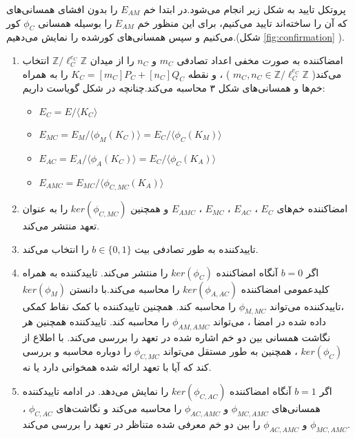 \documentclass[12pt,a4paper]{article}
\theoremstyle{plain}
\theoremstyle{definition}
\theoremstyle{remark}
\begin{document}
پروتکل تایید به شکل زیر انجام می‌شود.در ابتدا خم 
$E_{AM}$
را بدون افشای همسانی‌های که آن را ساخته‌اند تایید می‌کنیم، برای این منظور خم
$E_{AM}$
را بوسیله همسانی 
$\phi_C$
کور می‌کنیم و سپس همسانی‌های کورشده را نمایش می‌دهیم‌.(شکل 
\ref{fig:confirmation}
).

\begin{enumerate}
	\item 
	امضاکننده به صورت مخفی اعداد تصادفی
	$m_C$
	و
	$n_C$
	را از میدان 
	$\mathbb{Z} / \ell_C^{e_C} \mathbb{Z}$
	انتخاب می‌کند(
	$m_C , n_C \in \mathbb{Z} / \ell_C^{e_C} \mathbb{Z}$
	)
	، و نقطه
	$K_C = [m_C]P_C + [n_C]Q_C$
	را به همراه خم‌ها و همسانی‌های شکل ۳ محاسبه می‌کند.چنانچه در شکل گویاست داریم:
	\begin{itemize}
		\item 
		$E_C = E / \langle K_C \rangle$
		
		\item 
		$E_{MC} = E_M / \langle \phi_M(K_C) \rangle = E_C / \langle \phi_C(K_M) \rangle$
		
		\item 
		$E_{AC} = E_A / \langle \phi_A(K_C) \rangle = E_C / \langle \phi_C(K_A) \rangle$
		
		\item 
		$E_{AMC} = E_{MC} / \langle \phi_{C,MC}(K_A) \rangle $
	\end{itemize}

	\item 
	امضاکننده خم‌های
	$E_C$
	،
	$E_{AC}$
	،
	$E_{MC}$
	،
	$E_{AMC}$
	و همچنین 
	$ker(\phi_{C,MC})$
	را به عنوان تعهد منتشر می‌کند.
	
	\item 
	تاییدکننده به طور تصادفی بیت 
	$b \in \{0,1\}$
	را انتخاب می‌کند.
	
	\item 
	اگر 
	 $b=0$
	 آنگاه امضاکننده 
	 $ker(\phi_C)$
	 را منتشر می‌کند. تاییدکننده به همراه کلیدعمومی امضاکننده 
	 $ker(\phi_{A,AC})$
	 را محاسبه می‌کند.با دانستن
	 $ker(\phi_M)$
	 ،تاییدکننده می‌تواند 
	 $\phi_{M,MC}$
	 را محاسبه کند. همچنین تاییدکننده با کمک نقاط کمکی داده شده در امضا ، می‌تواند
	 $\phi_{AM,AMC}$
	 را محاسبه کند. تاییدکننده همچنین هر نگاشت همسانی‌ بین دو خم اشاره شده در تعهد را بررسی می‌کند.
با اطلاع از 
$ker(\phi_C)$
، همچنین به طور مستقل می‌تواند 
$\phi_{C,MC}$
را دوباره محاسبه و بررسی کند که آیا با تعهد ارائه شده همخوانی دارد یا نه.

\item 
اگر
$b=1$
آنگاه امضاکننده 
$ker(\phi_{C,AC})$
را نمایش می‌دهد. در ادامه تاییدکننده همسانی‌های 
$\phi_{MC,AMC}$
و
$\phi_{AC,AMC}$
را محاسبه می‌کند و نگاشت‌های 
$\phi_{C,AC}$
،
$\phi_{MC,AMC}$
و
$\phi_{AC,AMC}$
را بین دو خم معرفی شده متناظر در تعهد را بررسی می‌کند.
\end{enumerate}
\end{document}
